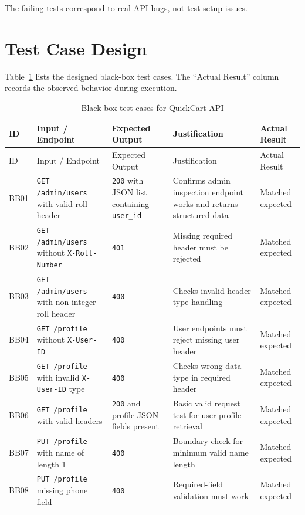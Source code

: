\documentclass[12pt]{article}
\begin{document}
The failing tests correspond to real API bugs, not test setup issues.

\section{Test Case Design}
Table~\ref{tab:testcases} lists the designed black-box test cases. The ``Actual Result'' column records the observed behavior during execution.

\renewcommand{\arraystretch}{1.15}
\small
\begin{longtable}{p{}p{}p{}p{}p{}}
\caption{Black-box test cases for QuickCart API}\label{tab:testcases}\\
\toprule
ID & Input / Endpoint & Expected Output & Justification & Actual Result \\
\midrule
\endfirsthead
\toprule
ID & Input / Endpoint & Expected Output & Justification & Actual Result \\
\midrule
\endhead
\bottomrule
\endfoot
BB01 & \texttt{GET /admin/users} with valid roll header & \texttt{200} with JSON list containing \texttt{user\_id} & Confirms admin inspection endpoint works and returns structured data & Matched expected \\
BB02 & \texttt{GET /admin/users} without \texttt{X-Roll-Number} & \texttt{401} & Missing required header must be rejected & Matched expected \\
BB03 & \texttt{GET /admin/users} with non-integer roll header & \texttt{400} & Checks invalid header type handling & Matched expected \\
BB04 & \texttt{GET /profile} without \texttt{X-User-ID} & \texttt{400} & User endpoints must reject missing user header & Matched expected \\
BB05 & \texttt{GET /profile} with invalid \texttt{X-User-ID} type & \texttt{400} & Checks wrong data type in required header & Matched expected \\
BB06 & \texttt{GET /profile} with valid headers & \texttt{200} and profile JSON fields present & Basic valid request test for user profile retrieval & Matched expected \\
BB07 & \texttt{PUT /profile} with name of length 1 & \texttt{400} & Boundary check for minimum valid name length & Matched expected \\
BB08 & \texttt{PUT /profile} missing phone field & \texttt{400} & Required-field validation must work & Matched expected \\

\end{longtable}
\end{document}
